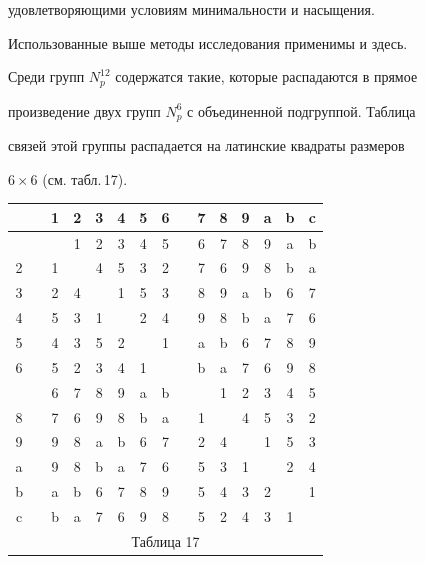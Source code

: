 удовлетворяющими условиям минимальности и насыщения. 


Использованные выше методы исследования применимы и здесь.


Среди групп $N^{12}_p$ содержатся такие, которые распадаются в прямое


произведение двух групп $N^6_p$ с объединенной подгруппой. Таблица


связей этой группы распадается на латинские квадраты размеров


$6\times 6$ (см. табл.\,17).


\smallskip


\begin{center}


\begin{tabular}{ccccccccccccccc}


\ & \vline & 1 & 2 & 3 & 4 & 5 & 6 & \vline & 7 & 8 & 9 & a & b & c \\


\hline


 1 & \vline & \ & 1 & 2 & 3 & 4 & 5 & \vline & 6 & 7 & 8 & 9 & a & b \\


2 & \vline & 1 & \ & 4 & 5 & 3 & 2 & \vline & 7 & 6 & 9 & 8 & b & a \\


3 & \vline & 2 & 4 & \ & 1 & 5 & 3 & \vline & 8 & 9 & a & b & 6 & 7 \\


4 & \vline & 5 & 3 & 1 & \ & 2 & 4 & \vline & 9 & 8 & b & a & 7 & 6 \\


5 & \vline & 4 & 3 & 5 & 2 & \ & 1 & \vline & a & b & 6 & 7 & 8 & 9 \\


6 & \vline & 5 & 2 & 3 & 4 & 1 & \ & \vline & b & a & 7 & 6 & 9 & 8 \\


\hline


 7 & \vline & 6 & 7 & 8 & 9 & a & b & \vline & \ & 1 & 2 & 3 & 4 & 5 \\


8 & \vline & 7 & 6 & 9 & 8 & b & a & \vline & 1 & \ & 4 & 5 & 3 & 2 \\


9 & \vline & 9 & 8 & a & b & 6 & 7 & \vline & 2 & 4 & \ & 1 & 5 & 3 \\


a & \vline & 9 & 8 & b & a & 7 & 6 & \vline & 5 & 3 & 1 & \ & 2 & 4 \\


b & \vline & a & b & 6 & 7 & 8 & 9 & \vline & 5 & 4 & 3 & 2 & \ & 1 \\


c & \vline & b & a & 7 & 6 & 9 & 8 & \vline & 5 & 2 & 4 & 3 & 1 & \ \\


\multicolumn{15}{c}{ Таблица 17}


\end{tabular}


\end{center}


